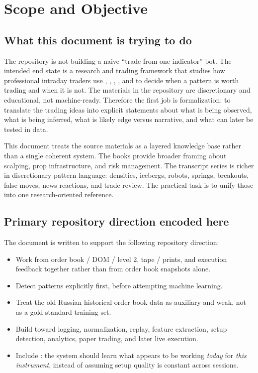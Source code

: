 \section{Scope and Objective}

\subsection{What this document is trying to do}

The repository is not building a naive ``trade from one indicator'' bot. The intended end state is a research and trading framework that studies how professional intraday traders use , , , , and  to decide when a pattern is worth trading and when it is not. The materials in the repository are discretionary and educational, not machine-ready. Therefore the first job is formalization: to translate the trading ideas into explicit statements about what is being observed, what is being inferred, what is likely edge versus narrative, and what can later be tested in data.

This document treats the source materials as a layered knowledge base rather than a single coherent system. The books provide broader framing about scalping, prop infrastructure, and risk management. The transcript series is richer in discretionary pattern language: densities, icebergs, robots, springs, breakouts, false moves, news reactions, and trade review. The practical task is to unify those into one research-oriented reference.

\subsection{Primary repository direction encoded here}

The document is written to support the following repository direction:

\begin{itemize}[leftmargin=1.5em]
\item Work from order book / DOM / level 2, tape / prints, and execution feedback together rather than from order book snapshots alone.
\item Detect patterns explicitly first, before attempting machine learning.
\item Treat the old Russian historical order book data as auxiliary and weak, not as a gold-standard training set.
\item Build toward logging, normalization, replay, feature extraction, setup detection, analytics, paper trading, and later live execution.
\item Include : the system should learn what appears to be working \emph{today} for \emph{this instrument}, instead of assuming setup quality is constant across sessions.
\end{itemize}

